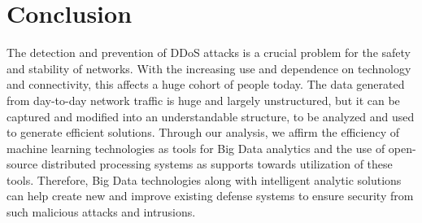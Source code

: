 \section{Conclusion}
The detection and prevention of DDoS attacks is a crucial problem for the safety and stability of networks. With the increasing use and dependence on technology and connectivity, this affects a huge cohort of people today. The data generated from day-to-day network traffic is huge and largely unstructured, but it can be captured and modified into an understandable structure, to be analyzed and used to generate efficient solutions. Through our analysis, we affirm the efficiency of machine learning technologies as tools for Big Data analytics and the use of open-source distributed processing systems as supports towards utilization of these tools. Therefore, Big Data technologies along with intelligent analytic solutions can help create new and improve existing defense systems to ensure security from such malicious attacks and intrusions. 





